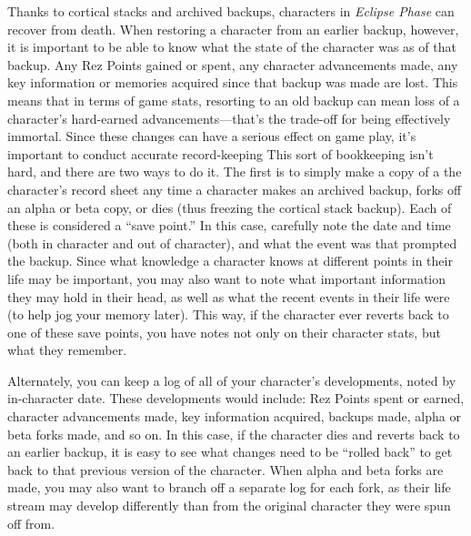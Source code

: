 Thanks to cortical stacks and archived backups, characters
in \textit{Eclipse Phase} can recover from death. When
restoring a character from an earlier backup, however, 
it is important to be able to know what the state of 
the character was as of that backup. Any Rez Points 
gained or spent, any character advancements made, 
any key information or memories acquired since that 
backup was made are lost. This means that in terms of 
game stats, resorting to an old backup can mean loss 
of a character's hard-earned advancements—that's the 
trade-off for being effectively immortal.
Since these changes can have a serious effect on 
game play, it's important to conduct accurate record-keeping
This sort of bookkeeping isn't hard, and
there are two ways to do it. The first is to simply 
make a copy of a the character's record sheet any 
time a character makes an archived backup, forks off 
an alpha or beta copy, or dies (thus freezing the cortical
stack backup). Each of these is considered a ``save
point.'' In this case, carefully note the date and time 
(both in character and out of character), and what 
the event was that prompted the backup. Since what 
knowledge a character knows at different points in 
their life may be important, you may also want to 
note what important information they may hold in 
their head, as well as what the recent events in their 
life were (to help jog your memory later). This way, 
if the character ever reverts back to one of these save 
points, you have notes not only on their character 
stats, but what they remember.

Alternately, you can keep a log of all of your 
character's developments, noted by in-character 
date. These developments would include: Rez Points 
spent or earned, character advancements made, key 
information acquired, backups made, alpha or beta 
forks made, and so on. In this case, if the character 
dies and reverts back to an earlier backup, it is easy 
to see what changes need to be ``rolled back'' to get 
back to that previous version of the character. When 
alpha and beta forks are made, you may also want to 
branch off a separate log for each fork, as their life 
stream may develop differently than from the original 
character they were spun off from.

